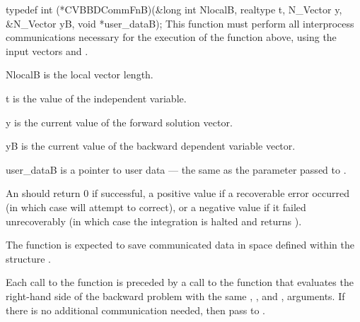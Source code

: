 {
  typedef int (*CVBBDCommFnB)(&long int NlocalB, realtype t, N\_Vector y,\\
                              &N\_Vector yB, void *user\_dataB);
}
{
  This  function must perform all interprocess communications necessary 
  for the execution of the  function above, using the input 
  vectors  and .
}
{
  \begin{args}
  \item[NlocalB] 
    is the local vector length.
  \item[t]
    is the value of the independent variable.
  \item[y]
    is the current value of the forward solution vector.
  \item[yB]
    is the current value of the backward dependent variable vector.
  \item[user\_dataB]
    is a pointer to user data --- the same as the 
    parameter passed to .
  \end{args}
}
{
  An  should return 0 if successful, a positive value if a recoverable
  error occurred (in which case {\cvodes} will attempt to correct), or a negative 
  value if it failed unrecoverably (in which case the integration is halted and
   returns ). 
}
{
  The  function is expected to save communicated data in space defined within the
  structure . 

  Each call to the  function is preceded by a call to the function that 
  evaluates the right-hand side of the backward problem with the same , , 
  and , arguments. If there is no additional communication needed, then 
  pass  to .
}
